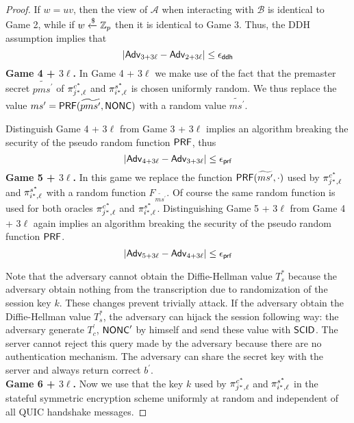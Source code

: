 \begin{proof}
 If $w=uv$, then the view of $\mathcal{A}$ when interacting with $\mathcal{B}$ is identical to Game 2, while if $w \xleftarrow{\$}\mathbb{Z}_p$ then it is identical to Game 3. Thus, the DDH assumption implies that
 \begin{equation}
  |\mathsf{Adv}_{3 + 3\ell} - \mathsf{Adv}_{2 + 3\ell}| \leq \epsilon_{\mathsf{ddh}}
 \end{equation}%
%
%
 \textbf{Game 4 + $3\ell$.} In Game 4 + 3$\ell$ we make use of the fact that the premaster secret $\widetilde{pms^{\prime}}$ of $\pi^{c^{\ast}}_{j^{\ast},\ell}$ and $\pi^{s^{\ast}}_{i^{\ast},\ell}$ is chosen uniformly random. We thus replace the value $ms^{\prime} = \mathsf{PRF}(\widetilde{pms^{\prime}}, \mathsf{NONC})$ with a random value $\widetilde{ms^{\prime}}$.

 Distinguish Game 4 + 3$\ell$ from Game 3 + 3$\ell$ implies an algorithm breaking the security of the pseudo random function $\mathsf{PRF}$, thus
 \begin{equation}
  |\mathsf{Adv}_{4 + 3\ell} - \mathsf{Adv}_{3 + 3\ell}| \leq \epsilon_{\mathsf{prf}}
 \end{equation}%
%
%
 \textbf{Game 5 + $3\ell$.} In this game we replace the function $\mathsf{PRF}(\widetilde{ms^{\prime}}, \cdot)$ used by $\pi^{c^{\ast}}_{j^{\ast},\ell}$ and $\pi^{s^{\ast}}_{i^{\ast},\ell}$ with a random function $F_{\widetilde{ms^{\prime}}}$. Of course the same random function is used for both oracles $\pi^{c^{\ast}}_{j^{\ast},\ell}$ and $\pi^{s^{\ast}}_{i^{\ast},\ell}$. Distinguishing Game 5 + 3$\ell$ from Game 4 + 3$\ell$ again implies an algorithm breaking the security of the pseudo random function $\mathsf{PRF}$.
 \begin{equation}
  |\mathsf{Adv}_{5 + 3\ell} - \mathsf{Adv}_{4 + 3\ell}| \leq \epsilon_{\mathsf{prf}}
 \end{equation}%

 Note that the adversary cannot obtain the Diffie-Hellman value $T_s^{\ast}$ because the adversary obtain nothing from the transcription due to randomization of the session key $k$. These changes prevent trivially attack. If the adversary obtain the Diffie-Hellman value $T_s^{\ast}$, the adversary can hijack the session following way: the adversary generate $T_c^{\prime}$, $\mathsf{NONC}^{\prime}$ by himself and send these value with $\mathsf{SCID}$. The server cannot reject this query made by the adversary because there are no authentication mechanism. The adversary can share the secret key with the server and always return correct $b^{\prime}$.
\vspace{10pt}\\%
%
%
 \textbf{Game 6 + $3\ell$.} Now we use that the key $k$ used by $\pi^{c^{\ast}}_{j^{\ast},\ell}$ and $\pi^{s^{\ast}}_{i^{\ast},\ell}$ in the stateful symmetric encryption scheme uniformly at random and independent of all QUIC handshake messages.


\end{proof}
